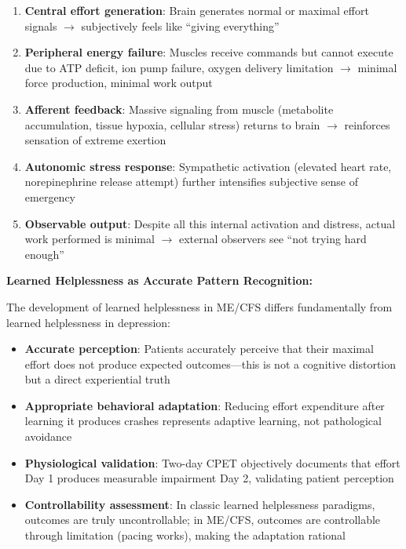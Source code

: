 \begin{enumerate}
    \item \textbf{Central effort generation}: Brain generates normal or maximal effort signals $\rightarrow$ subjectively feels like ``giving everything''

    \item \textbf{Peripheral energy failure}: Muscles receive commands but cannot execute due to ATP deficit, ion pump failure, oxygen delivery limitation $\rightarrow$ minimal force production, minimal work output

    \item \textbf{Afferent feedback}: Massive signaling from muscle (metabolite accumulation, tissue hypoxia, cellular stress) returns to brain $\rightarrow$ reinforces sensation of extreme exertion

    \item \textbf{Autonomic stress response}: Sympathetic activation (elevated heart rate, norepinephrine release attempt) further intensifies subjective sense of emergency

    \item \textbf{Observable output}: Despite all this internal activation and distress, actual work performed is minimal $\rightarrow$ external observers see ``not trying hard enough''
\end{enumerate}

\textbf{Learned Helplessness as Accurate Pattern Recognition:}

The development of learned helplessness in ME/CFS differs fundamentally from learned helplessness in depression:

\begin{itemize}
    \item \textbf{Accurate perception}: Patients accurately perceive that their maximal effort does not produce expected outcomes---this is not a cognitive distortion but a direct experiential truth

    \item \textbf{Appropriate behavioral adaptation}: Reducing effort expenditure after learning it produces crashes represents adaptive learning, not pathological avoidance

    \item \textbf{Physiological validation}: Two-day CPET objectively documents that effort Day 1 produces measurable impairment Day 2, validating patient perception

    \item \textbf{Controllability assessment}: In classic learned helplessness paradigms, outcomes are truly uncontrollable; in ME/CFS, outcomes are controllable through limitation (pacing works), making the adaptation rational
\end{itemize}

